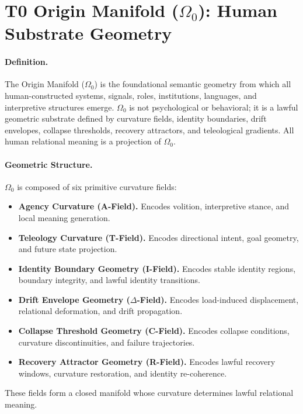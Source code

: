 \section*{T0 Origin Manifold ($\Omega_0$): Human Substrate Geometry}

\paragraph{Definition.}
The Origin Manifold ($\Omega_0$) is the foundational semantic geometry from which all
human-constructed systems, signals, roles, institutions, languages, and
interpretive structures emerge. $\Omega_0$ is not psychological or behavioral; it is a
lawful geometric substrate defined by curvature fields, identity boundaries,
drift envelopes, collapse thresholds, recovery attractors, and teleological
gradients. All human relational meaning is a projection of $\Omega_0$.

\paragraph{Geometric Structure.}
$\Omega_0$ is composed of six primitive curvature fields:

\begin{itemize}[leftmargin=1.2cm]
    \item \textbf{Agency Curvature (A-Field).} Encodes volition, interpretive stance, and local meaning generation.
    \item \textbf{Teleology Curvature (T-Field).} Encodes directional intent, goal geometry, and future state projection.
    \item \textbf{Identity Boundary Geometry (I-Field).} Encodes stable identity regions, boundary integrity, and lawful identity transitions.
    \item \textbf{Drift Envelope Geometry ($\Delta$-Field).} Encodes load-induced displacement, relational deformation, and drift propagation.
    \item \textbf{Collapse Threshold Geometry (C-Field).} Encodes collapse conditions, curvature discontinuities, and failure trajectories.
    \item \textbf{Recovery Attractor Geometry (R-Field).} Encodes lawful recovery windows, curvature restoration, and identity re-coherence.
\end{itemize}




These fields form a closed manifold whose curvature determines lawful relational meaning.

